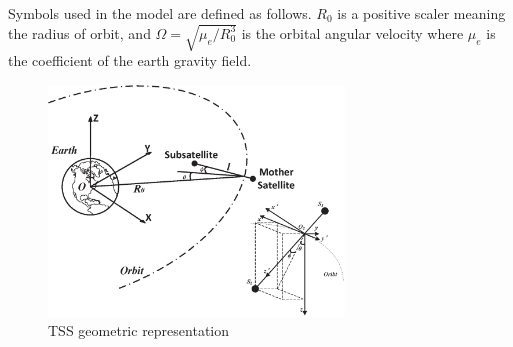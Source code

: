 \documentclass[3p]{elsarticle}
\theoremstyle{plain}
\theoremstyle{remark}
\begin{document}
Symbols used in the model are defined as follows. $R_0$ is a positive scaler meaning the radius of orbit, and $\Omega = \sqrt{\mu_e/R_0^3}$ is the orbital angular velocity where $\mu_e$ is the coefficient of the earth gravity field.\par
\begin{figure}[http]
\centering
\includegraphics[width=0.7\textwidth]{paper4_fig1.eps}
\caption{TSS geometric representation}
\label{fig:1}
\end{figure}
\end{document}
